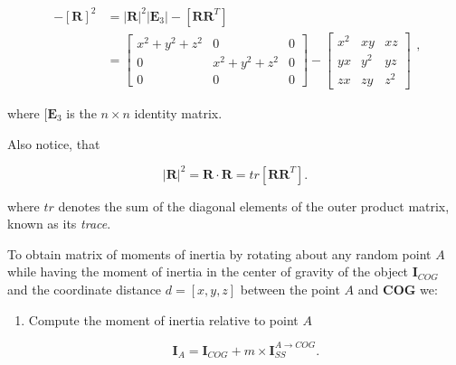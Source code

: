 \begin{itemize}
        \begin{equation}
            \begin{array}{ll}
                 \\
                -[\mathbf{R}]^{2}
                &= |\mathbf{R}|^{2}|\mathbf{E}_{3}| - [\mathbf{R}\mathbf{R}^{T}] \\
                &= \begin{bmatrix}
                    x^{2} + y^{2} + z^{2} & 0 & 0 \\
                    0 & x^{2} + y^{2} + z^{2} & 0 \\
                    0 & 0 & 0
                \end{bmatrix} - \begin{bmatrix}
                    x^{2} & xy & xz \\
                    yx & y^{2} & yz \\
                    zx & zy & z^{2}
                \end{bmatrix}
            \end{array}
        ,\end{equation}

        where $[\mathbf{E}_{3}$ is the $n \times n$  identity matrix.

        Also notice, that

        \begin{equation}
            |\mathbf{R}|^{2} = \mathbf{R} \cdot \mathbf{R} = tr [\mathbf{R}\mathbf{R}^{T}]
        .\end{equation}

        where $tr$ denotes the sum of the diagonal elements of the outer product
        matrix, known as its \textit{trace}.

        To obtain matrix of moments of inertia by rotating about any random
        point $A$ while having the moment of inertia in the center of gravity of
        the object $\mathbf{I}_{COG}$ and the coordinate distance $d = [x, y, z]$
        between the point $A$ and \textbf{COG} we:

        \begin{enumerate}
            \item Compute the moment of inertia relative to point $A$

                 \begin{equation}
                    \mathbf{I}_{A} = \mathbf{I}_{COG} + m \times \mathbf{I}_{SS}^{A \to COG}
                .\end{equation}


\end{enumerate}
\end{itemize}
